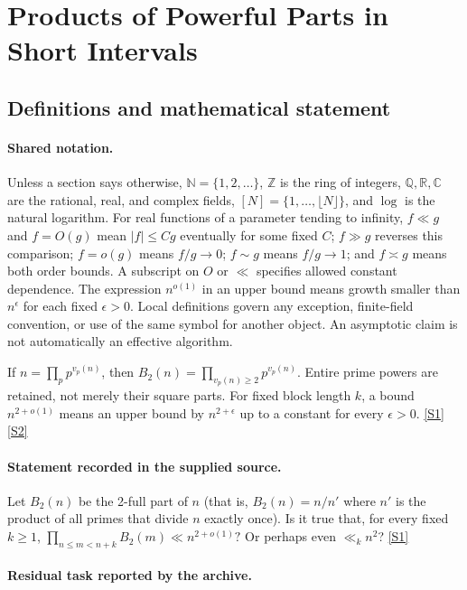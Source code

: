 \documentclass[11pt,a4paper]{article}
\newcommand{\N}{\mathbb{N}}
\newcommand{\Z}{\mathbb{Z}}
\newcommand{\Q}{\mathbb{Q}}
\newcommand{\R}{\mathbb{R}}
\newcommand{\C}{\mathbb{C}}
\newcommand{\sref}[2]{\hyperlink{source:#1:#2}{[S#2]}}
\begin{document}
\section{Products of Powerful Parts in Short Intervals}\label{statement}


\subsection{Definitions and mathematical statement}

\paragraph{Shared notation.}Unless a section says otherwise, $\N=\{1,2,\ldots\}$,
$\Z$ is the ring of integers, $\Q,\R,\C$ are the rational, real, and complex
fields, $[N]=\{1,\ldots,\lfloor N\rfloor\}$, and $\log$ is the natural
logarithm. For real functions of a parameter tending to infinity,
$f\ll g$ and $f=O(g)$ mean $|f|\leq Cg$ eventually for some fixed $C$;
$f\gg g$ reverses this comparison; $f=o(g)$ means $f/g\to0$;
$f\sim g$ means $f/g\to1$; and $f\asymp g$ means both order bounds.
A subscript on $O$ or $\ll$ specifies allowed constant dependence.
The expression $n^{o(1)}$ in an upper bound means growth smaller than
$n^\epsilon$ for each fixed $\epsilon>0$. Local definitions govern any
exception, finite-field convention, or use of the same symbol for another
object. An asymptotic claim is not automatically an effective algorithm.



If $n=\prod_pp^{v_p(n)}$, then $B_2(n)=\prod_{v_p(n)\geq2}p^{v_p(n)}$. Entire prime powers are retained, not merely their square parts. For fixed block length $k$, a bound $n^{2+o(1)}$ means an upper bound by $n^{2+\epsilon}$ up to a constant for every $\epsilon>0$. \sref{statement}{1} \sref{statement}{2}

\paragraph{Statement recorded in the supplied source.}
Let $B_2(n)$ be the 2-full part of $n$ (that is, $B_2(n)=n/n'$ where $n'$ is the product of all primes that divide $n$ exactly once). Is it true that, for every fixed $k\geq 1$, $ \prod_{n\leq m<n+k}B_2(m) \ll n^{2+o(1)}? $ Or perhaps even $\ll_k n^2$? \sref{statement}{1}

\paragraph{Residual task reported by the archive.}
\end{document}

